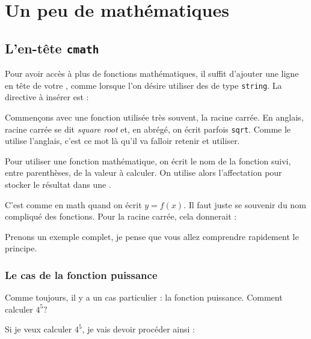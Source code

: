 \chapter{Un peu de mathématiques}
\section{L'en-tête \lstinline|cmath|}
Pour avoir accès à plus de fonctions mathématiques, il suffit d'ajouter une ligne en tête de votre \prog, comme lorsque l'on désire utiliser des \varis de type \lstinline|string|. La directive à insérer est :


Commençons avec une fonction utilisée très souvent, la racine carrée. En anglais, racine carrée se dit \textit{square root} et, en abrégé, on écrit parfois \lstinline|sqrt|. Comme le \cplus utilise l'anglais, c'est ce mot là qu'il va falloir retenir et utiliser.

Pour utiliser une fonction mathématique, on écrit le nom de la fonction suivi, entre parenthèses, de la valeur à calculer. On utilise alors l'affectation pour stocker le résultat dans une \vari.

C'est comme en math quand on écrit $y = f(x)$. Il faut juste se souvenir du nom compliqué des fonctions. Pour la racine carrée, cela donnerait : 

Prenons un exemple complet, je pense que vous allez comprendre rapidement le principe.



\subsection{Le cas de la fonction puissance}
Comme toujours, il y a un cas particulier : la fonction puissance. Comment calculer $4^5?$

Si je veux calculer $4^5$, je vais devoir procéder ainsi :

